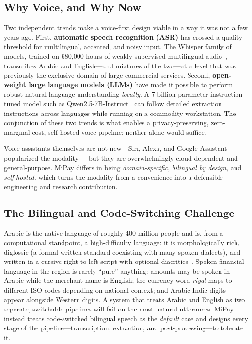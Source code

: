 \subsection{Why Voice, and Why Now}

Two independent trends make a voice-first design viable in a way it was not a few
years ago. First, \textbf{automatic speech recognition (ASR)} has crossed a
quality threshold for multilingual, accented, and noisy input. The Whisper family
of models, trained on 680{,}000 hours of weakly supervised multilingual
audio~\cite{radford2023whisper}, transcribes Arabic and English---and mixtures of
the two---at a level that was previously the exclusive domain of large commercial
services. Second, \textbf{open-weight large language models (LLMs)} have made it
possible to perform robust natural-language understanding \emph{locally}. A
7-billion-parameter instruction-tuned model such as
Qwen2.5-7B-Instruct~\cite{qwen2024qwen25} can follow detailed extraction
instructions across languages while running on a commodity workstation. The
conjunction of these two trends is what enables a privacy-preserving,
zero-marginal-cost, self-hosted voice pipeline; neither alone would suffice.

Voice assistants themselves are not new---Siri, Alexa, and Google Assistant
popularized the modality~\cite{hoy2018voice,kepuska2018assistants}---but they are
overwhelmingly cloud-dependent and general-purpose. MiPay differs in being
\emph{domain-specific}, \emph{bilingual by design}, and \emph{self-hosted}, which
turns the modality from a convenience into a defensible engineering and research
contribution.

\subsection{The Bilingual and Code-Switching Challenge}

Arabic is the native language of roughly 400 million people and is, from a
computational standpoint, a high-difficulty language: it is morphologically rich,
diglossic (a formal written standard coexisting with many spoken dialects), and
written in a cursive right-to-left script with optional
diacritics~\cite{antoun2020arabert,obeid2020camel}. Spoken financial language in
the region is rarely ``pure'' anything: amounts may be spoken in Arabic while the
merchant name is English; the currency word \emph{riyal} maps to different ISO
codes depending on national context; and Arabic-Indic digits appear alongside
Western digits. A system that treats Arabic and English as two separate,
switchable pipelines will fail on the most natural utterances. MiPay instead
treats code-switched bilingual speech as the \emph{default} case and designs
every stage of the pipeline---transcription, extraction, and
post-processing---to tolerate it.

